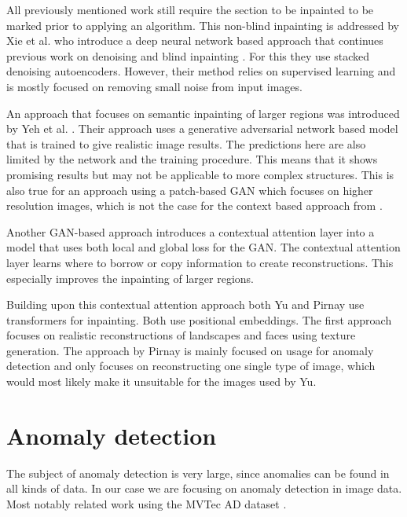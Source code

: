 All previously mentioned work still require the section to be inpainted to be marked prior to applying an algorithm. This non-blind inpainting is addressed by Xie et al. \cite{xie_image_2012} who introduce a deep neural network based approach that continues previous work on denoising \cite{mairal_sparse_2008} and blind inpainting \cite{dong_wavelet_2012}. For this they use stacked denoising autoencoders. However, their method relies on supervised learning and is mostly focused on removing small noise from input images.

An approach that focuses on semantic inpainting of larger regions was introduced by Yeh et al. \cite{yeh_semantic_2017}. Their approach uses a generative adversarial network based model that is trained to give realistic image results. The predictions here are also limited by the network and the training procedure. This means that it shows promising results but may not be applicable to more complex structures. This is also true for an approach using a patch-based GAN \cite{demir_patch-based_2018} which focuses on higher resolution images, which is not the case for the context based approach from \cite{pathak_context_2016}.

Another GAN-based approach \cite{yu_generative_2018} introduces a contextual attention layer into a model that uses both local and global loss for the GAN. The contextual attention layer learns where to borrow or copy information to create reconstructions. This especially improves the inpainting of larger regions.

Building upon this contextual attention approach both Yu \cite{yu_diverse_2021} and Pirnay \cite{pirnay_inpainting_2021} use transformers for inpainting. Both use positional embeddings. The first approach focuses on realistic reconstructions of landscapes and faces using texture generation. The approach by Pirnay is mainly focused on usage for anomaly detection and only focuses on reconstructing one single type of image, which would most likely make it unsuitable for the images used by Yu.

\section{Anomaly detection}
\label{sec:relwork:anomaly-detection}

The subject of anomaly detection is very large, since anomalies can be found in all kinds of data. In our case we are focusing on anomaly detection in image data. Most notably related work using the MVTec AD dataset \cite{bergmann_mvtec_2019}.

